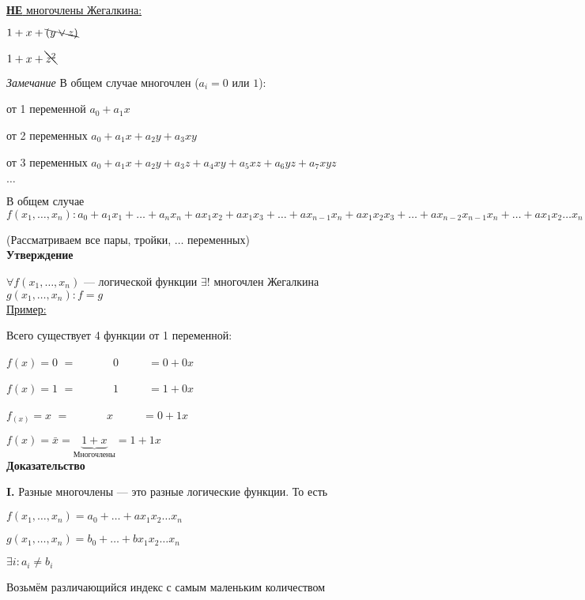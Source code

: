 \documentclass[a4paper, 12pt] {article}
\begin{document}
\underline{\textbf{НЕ} многочлены Жегалкина:}

$ 1+x+ \bcancel{(y \vee z)} $

$ 1+x+ \bcancel{z^{2}} $

\textit{Замечание} В общем случае многочлен ($ a_{i} = 0 $ или $1 $):

от 1 переменной $ a_{0} +a_{1}x$

от 2 переменных $ a_{0} +a_{1}x+a_{2}y +a_{3}xy$

от 3 переменных $ a_{0} +a_{1}x+a_{2}y +a_{3}z + a_{4}xy+a_{5}xz+a_{6}yz+a_{7}xyz$

$ \dots $

В общем случае $ f(x_{1}, \dots , x_{n}):  a_{0}+ a_{1} x_{1}+\dots+a_{n} x_{n}+ax_{1}x_{2}+ax_{1}x_{3}+\dots+ax_{n-1}x_{n}+ax_{1}x_{2}x_{3} +\dots+ax_{n-2}x_{n-1}x_{n}+\dots+ax_{1}x_{2}\dots x_{n} $

(Рассматриваем все пары, тройки, $ \dots $ переменных)\\

\textbf{Утверждение} 

$ \forall f(x_{1}, \dots , x_{n}) $ --- логической функции $ \exists! $ многочлен Жегалкина $ g(x_{1}, \dots , x_{n}): f=g $\\

\underline{Пример:}

Всего существует 4 функции от 1 переменной:

$ f(x)= 0 $ $= \text{	} \text{	} \text{	} \text{	} \text{	} 0 \text{	} \text{	} \text{	} \text{	}  = 0+0x$

$ f(x)= 1 $ $ = \text{	} \text{	} \text{	} \text{	} \text{	} 1 \text{	} \text{	} \text{	} \text{	}  = 1+0x$

$ f_(x)=x $ $= \text{	} \text{	} \text{	} \text{	} \text{	} x \text{	} \text{	} \text{	} \text{	}   = 0+1x$

$f(x)= \bar x = \underbrace{1+x}_{\text{Многочлены}}= 1+1x$\\

\textbf{Доказательство}

\textbf{I.} Разные многочлены --- это разные логические функции. То есть 

$ f(x_{1}, \dots , x_{n})=a_{0}+\dots+ax_{1}x_{2}\dots x_{n} $

$ g(x_{1}, \dots , x_{n})=b_{0}+\dots+bx_{1}x_{2}\dots x_{n} $

$ \exists i : a_{i} \ne b_{i} $

Возьмём различающийся индекс с самым маленьким количеством 
\end{document}
